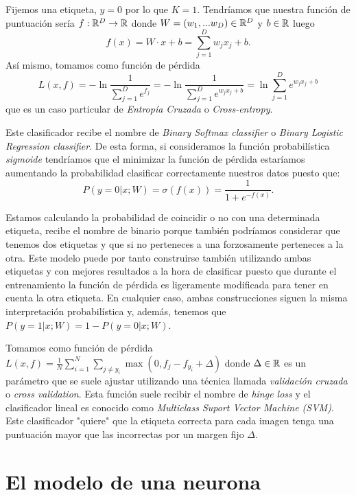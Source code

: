 \begin{ejemplo}\label{SoftMaxBinary}
Fijemos una etiqueta, $y=0$ por lo que $K=1$. Tendríamos que nuestra función de puntuación sería $f:\mathbb{R}^D \to \mathbb{R}$ donde $W=(w_1,...w_D)\in \mathbb{R}^D$ y $b\in \mathbb{R}$ luego $$f(x)=W\cdot x + b = \sum_{j=1}^D w_j x_j+b.$$ Así mismo, tomamos como función de pérdida $$L(x,f)=-\ln \frac{1}{\sum_{j=1}^D e^{f_j}}=-\ln \frac{1}{\sum_{j=1}^D e^{w_j x_j +b}}=\ln\sum_{j=1}^D e^{w_j x_j +b}$$ que es un caso particular de \emph{Entropía Cruzada} o \emph{Cross-entropy}.\newline

Este clasificador recibe el nombre de \emph{Binary Softmax classifier} o \emph{Binary Logistic Regression classifier}. De esta forma, si consideramos la función probabilística \emph{sigmoide} tendríamos que el minimizar la función de pérdida estaríamos aumentando la probabilidad clasificar correctamente nuestros datos puesto que: $$P(y=0 | x; W)=\sigma (f(x)) = \frac{1}{1+e^{-f(x)}}.$$

\begin{observacion}
Estamos calculando la probabilidad de coincidir o no con una determinada etiqueta, recibe el nombre de binario porque también podríamos considerar que tenemos dos etiquetas y que si no perteneces a una forzosamente perteneces a la otra. Este modelo puede por tanto construirse también utilizando ambas etiquetas y con mejores resultados a la hora de clasificar puesto que durante el entrenamiento la función de pérdida es ligeramente modificada para tener en cuenta la otra etiqueta. En cualquier caso, ambas construcciones siguen la misma interpretación probabilística y, además, tenemos que $P(y=1 | x; W)=1-P(y=0 | x; W)$.
\end{observacion}
\end{ejemplo}

\begin{ejemplo}\label{SVM}
Tomamos como función de pérdida $L(x,f)=\frac{1}{N} \sum_{i=1}^N \sum_{j \neq y_i} \max(0,f_j-f_{y_i} + \Delta)$ donde $\Delta \in \mathbb{R}$ es un parámetro que se suele ajustar utilizando una técnica llamada \emph{validación cruzada} o \emph{cross validation}. Esta función suele recibir el nombre de \emph{hinge loss} y el clasificador lineal es conocido como \emph{Multiclass Suport Vector Machine (SVM)}. Este clasificador "quiere" que la etiqueta correcta para cada imagen tenga una puntuación mayor que las incorrectas por un margen fijo $\Delta$.
\end{ejemplo}
\section{El modelo de una neurona}

